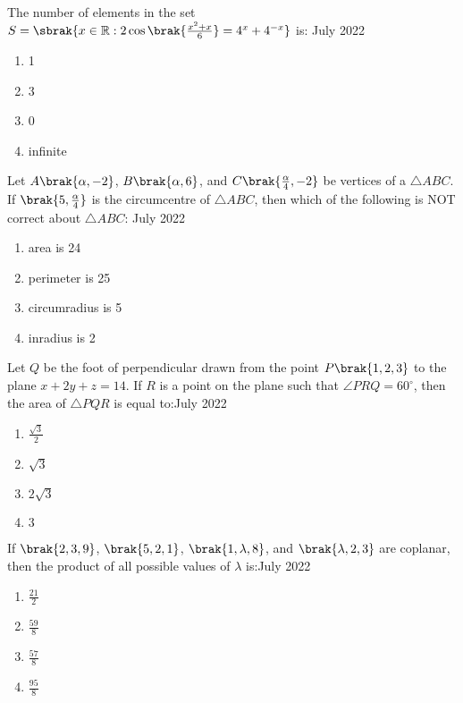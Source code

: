     \item The number of elements in the set $S=\sbrak{x\in\mathbb{R}:2\cos\brak{\frac{x^{2}+x}{6}}=4^{x}+4^{-x}}$ is: \hfill{July 2022}

        \begin{multicols}{4}
        \begin{enumerate}
        \item 1
        \item 3
        \item 0
        \item infinite
        \end{enumerate}
        \end{multicols}

    \item Let $A\brak{\alpha,-2}$, $B\brak{\alpha,6}$, and $C\brak{\frac{\alpha}{4},-2}$ be vertices of a $\triangle ABC$. If $\brak{5,\frac{\alpha}{4}}$ is the circumcentre of $\triangle ABC$, then which of the following is NOT correct about $\triangle ABC$: \hfill{July 2022}

        \begin{multicols}{4}
        \begin{enumerate}
        \item area is 24
        \item perimeter is 25
        \item circumradius is 5
        \item inradius is 2
        \end{enumerate}
        \end{multicols}

    \item Let $Q$ be the foot of perpendicular drawn from the point $P\brak{1,2,3}$ to the plane $x+2y+z=14$. If $R$ is a point on the plane such that $\angle PRQ=60^{\circ}$, then the area of $\triangle PQR$ is equal to:\hfill{July 2022}

        \begin{multicols}{4}
        \begin{enumerate}
        \item $\frac{\sqrt{3}}{2}$
        \item $\sqrt{3}$
        \item $2\sqrt{3}$
        \item $3$
        \end{enumerate}
        \end{multicols}
                
    \item If $\brak{2,3,9}$, $\brak{5,2,1}$, $\brak{1,\lambda,8}$, and $\brak{\lambda,2,3}$ are coplanar, then the product of all possible values of $\lambda$ is:\hfill{July 2022}

        \begin{multicols}{4}
        \begin{enumerate}
        \item $\frac{21}{2}$
        \item $\frac{59}{8}$
        \item $\frac{57}{8}$
        \item $\frac{95}{8}$
        \end{enumerate}
        \end{multicols}

